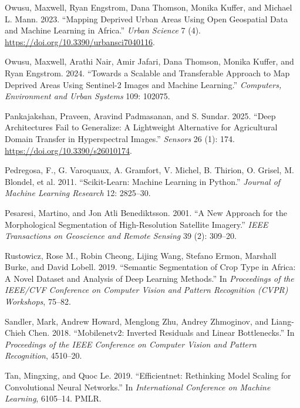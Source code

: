 \documentclass[
  journal,
  twocolumn]{IEEEtran}
\newlength{\cslhangindent}
\newlength{\cslentryspacingunit} %
\newenvironment{CSLReferences}[2] %
 {%
  \setlength{\parindent}{0pt}
  \ifodd #1
  \let\oldpar\par
  \def\par{\hangindent=\cslhangindent\oldpar}
  \fi
  \setlength{\parskip}{#2\cslentryspacingunit}
 }%
 {}
\begin{document}
\begin{CSLReferences}{1}{0}
\leavevmode{}%
Owusu, Maxwell, Ryan Engstrom, Dana Thomson, Monika Kuffer, and Michael
L. Mann. 2023. {``Mapping Deprived Urban Areas Using Open Geospatial
Data and Machine Learning in Africa.''} \emph{Urban Science} 7 (4).
\url{https://doi.org/10.3390/urbansci7040116}.

\leavevmode{}%
Owusu, Maxwell, Arathi Nair, Amir Jafari, Dana Thomson, Monika Kuffer,
and Ryan Engstrom. 2024. {``Towards a Scalable and Transferable Approach
to Map Deprived Areas Using Sentinel-2 Images and Machine Learning.''}
\emph{Computers, Environment and Urban Systems} 109: 102075.

\leavevmode{}%
Pankajakshan, Praveen, Aravind Padmasanan, and S. Sundar. 2025. {``Deep
Architectures Fail to Generalize: A Lightweight Alternative for
Agricultural Domain Transfer in Hyperspectral Images.''} \emph{Sensors}
26 (1): 174. \url{https://doi.org/10.3390/s26010174}.

\leavevmode{}%
Pedregosa, F., G. Varoquaux, A. Gramfort, V. Michel, B. Thirion, O.
Grisel, M. Blondel, et al. 2011. {``Scikit-Learn: Machine Learning in
{P}ython.''} \emph{Journal of Machine Learning Research} 12: 2825--30.

\leavevmode{}%
Pesaresi, Martino, and Jon Atli Benediktsson. 2001. {``A New Approach
for the Morphological Segmentation of High-Resolution Satellite
Imagery.''} \emph{IEEE Transactions on Geoscience and Remote Sensing} 39
(2): 309--20.

\leavevmode{}%
Rustowicz, Rose M., Robin Cheong, Lijing Wang, Stefano Ermon, Marshall
Burke, and David Lobell. 2019. {``Semantic Segmentation of Crop Type in
Africa: A Novel Dataset and Analysis of Deep Learning Methods.''} In
\emph{Proceedings of the IEEE/CVF Conference on Computer Vision and
Pattern Recognition (CVPR) Workshops}, 75--82.

\leavevmode{}%
Sandler, Mark, Andrew Howard, Menglong Zhu, Andrey Zhmoginov, and
Liang-Chieh Chen. 2018. {``Mobilenetv2: Inverted Residuals and Linear
Bottlenecks.''} In \emph{Proceedings of the IEEE Conference on Computer
Vision and Pattern Recognition}, 4510--20.

\leavevmode{}%
Tan, Mingxing, and Quoc Le. 2019. {``Efficientnet: Rethinking Model
Scaling for Convolutional Neural Networks.''} In \emph{International
Conference on Machine Learning}, 6105--14. PMLR.


\end{CSLReferences}
\end{document}

